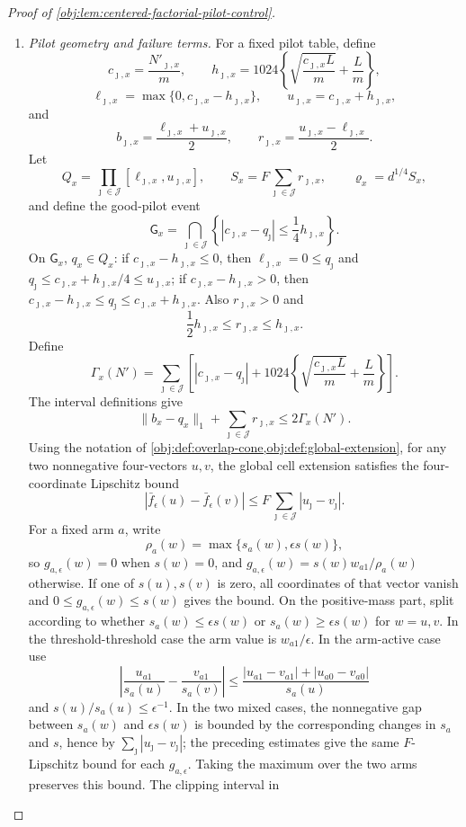 \documentclass[11pt]{article}
\begin{document}
\begin{proof}[Proof of \cref{obj:lem:centered-factorial-pilot-control}]
\begin{enumerate}
\item \label{item:pf-pilot-geometry-failure}\emph{Pilot geometry and failure terms.}
For a fixed pilot table, define
\[
c_{\jmath,x}=\frac{N'_{\jmath,x}}m,\qquad
h_{\jmath,x}=1024\left\{\sqrt{\frac{c_{\jmath,x}L}{m}}+\frac Lm\right\},
\]
\[
\ell_{\jmath,x}=\max\{0,c_{\jmath,x}-h_{\jmath,x}\},\qquad
u_{\jmath,x}=c_{\jmath,x}+h_{\jmath,x},
\]
and
\[
b_{\jmath,x}=\frac{\ell_{\jmath,x}+u_{\jmath,x}}2,\qquad
r_{\jmath,x}=\frac{u_{\jmath,x}-\ell_{\jmath,x}}2 .
\]
Let
\[
Q_x=\prod_{\jmath\in\mathcal J}[\ell_{\jmath,x},u_{\jmath,x}],
\qquad
S_x=F\sum_{\jmath\in\mathcal J}r_{\jmath,x},
\qquad
\varrho_x=d^{1/4}S_x,
\]
and define the good-pilot event
\[
\mathsf G_x
=
\bigcap_{\jmath\in\mathcal J}
\left\{
|c_{\jmath,x}-q_\jmath|\le \frac14h_{\jmath,x}
\right\}.
\]
On \(\mathsf G_x\), \(q_x\in Q_x\): if \(c_{\jmath,x}-h_{\jmath,x}\le0\), then
\(\ell_{\jmath,x}=0\le q_\jmath\) and
\(q_\jmath\le c_{\jmath,x}+h_{\jmath,x}/4\le u_{\jmath,x}\); if
\(c_{\jmath,x}-h_{\jmath,x}>0\), then
\(c_{\jmath,x}-h_{\jmath,x}\le q_\jmath\le c_{\jmath,x}+h_{\jmath,x}\).
Also \(r_{\jmath,x}>0\) and
\[
\frac12h_{\jmath,x}\le r_{\jmath,x}\le h_{\jmath,x}.
\]
Define
\[
\Gamma_x(N')
=
\sum_{\jmath\in\mathcal J}
\left[
|c_{\jmath,x}-q_\jmath|
+
1024\left\{\sqrt{\frac{c_{\jmath,x}L}{m}}+\frac Lm\right\}
\right].
\]
The interval definitions give
\[
\|b_x-q_x\|_1+\sum_{\jmath\in\mathcal J}r_{\jmath,x}
\le 2\Gamma_x(N').
\]
Using the notation of \cref{obj:def:overlap-cone,obj:def:global-extension}, for any two nonnegative four-vectors \(u,v\), the global cell extension satisfies the four-coordinate Lipschitz bound
\[
|\bar f_\epsilon(u)-\bar f_\epsilon(v)|
\le
F\sum_{\jmath\in\mathcal J}|u_\jmath-v_\jmath|.
\]
For a fixed arm \(a\), write
\[
\rho_a(w)=\max\{s_a(w),\epsilon s(w)\},
\]
so \(g_{a,\epsilon}(w)=0\) when \(s(w)=0\), and
\(g_{a,\epsilon}(w)=s(w)w_{a1}/\rho_a(w)\) otherwise.  If one of
\(s(u),s(v)\) is zero, all coordinates of that vector vanish and
\(0\le g_{a,\epsilon}(w)\le s(w)\) gives the bound.  On the positive-mass part, split according to whether
\(s_a(w)\le\epsilon s(w)\) or \(s_a(w)\ge\epsilon s(w)\) for \(w=u,v\).  In the threshold-threshold case the arm value is
\(w_{a1}/\epsilon\).  In the arm-active case use
\[
\left|\frac{u_{a1}}{s_a(u)}-\frac{v_{a1}}{s_a(v)}\right|
\le
\frac{|u_{a1}-v_{a1}|+|u_{a0}-v_{a0}|}{s_a(u)}
\]
and \(s(u)/s_a(u)\le\epsilon^{-1}\).  In the two mixed cases, the nonnegative gap between \(s_a(w)\) and \(\epsilon s(w)\) is bounded by the corresponding changes in \(s_a\) and \(s\), hence by
\(\sum_{\jmath}|u_\jmath-v_\jmath|\); the preceding estimates give the same \(F\)-Lipschitz bound for each \(g_{a,\epsilon}\).  Taking the maximum over the two arms preserves this bound.  The clipping interval in

\end{enumerate}
\end{proof}
\end{document}
